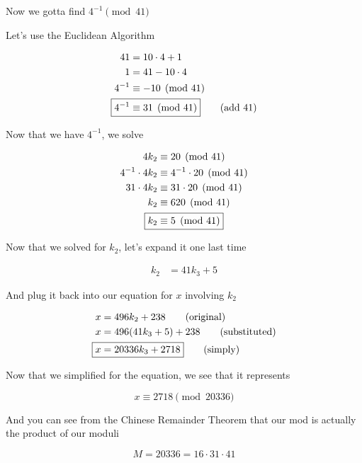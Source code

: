 \documentclass[../../Main.tex]{subfiles}
\begin{document}
\begin{example}
    Now we gotta find $4^{-1} \pmod{41}$

    Let's use the Euclidean Algorithm

    \begin{align*}
        41 &= 10 \cdot 4 + 1 \\
        1 &= 41 - 10 \cdot 4 \\
        4^{-1} &\equiv -10 \pmod{41} \\
        \Aboxed{4^{-1} &\equiv 31 \pmod{41}} \tag{add 41} \\
    \end{align*}

    Now that we have $4^{-1}$, we solve

    \begin{align*}
        4k_2 &\equiv 20 \pmod{41} \\
        4^{-1} \cdot 4k_2 &\equiv 4^{-1} \cdot 20 \pmod{41} \\
        31 \cdot 4k_2 &\equiv 31 \cdot 20 \pmod{41} \\
        k_2 &\equiv 620 \pmod{41} \\
        \Aboxed{k_2 &\equiv 5 \pmod{41}} \\
    \end{align*}

    Now that we solved for $k_2$, let's expand it one last time

    \begin{align*}
        k_2 &= 41k_3 + 5
    \end{align*}

    And plug it back into our equation for $x$ involving $k_2$

    \begin{align*}
        x &= 496 k_2 + 238 \tag{original} \\
        x &= 496(41k_3 + 5) + 238 \tag{substituted} \\
        \Aboxed{x &= 20336k_3 + 2718} \tag{simply} \\
    \end{align*}

    Now that we simplified for the equation, we see that it represents

    $$\boxed{x \equiv 2718 \pmod{20336}}$$

    And you can see from the Chinese Remainder Theorem that our mod is actually the product of our moduli

    $$M = 20336 = 16 \cdot 31 \cdot 41$$
\end{example}
\end{document}
